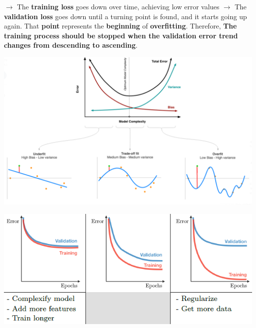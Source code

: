 \documentclass[letterpaper, 10.5pt,landscape]{article}
\begin{document}
\begin{multicols*}{3}
$\rightarrow$ The \textbf{training loss} goes down over time, achieving low error values
$\rightarrow$ The \textbf{validation loss} goes down until a turning point is found, and it starts going up again. That \textbf{point} represents the \textbf{beginning} of \textbf{overfitting}. Therefore, \textbf{The training process should be stopped when the validation error trend changes from descending to ascending}.


\vspace{-3pt}
\begin{center}
    \begin{minipage}{\linewidth}
        \includegraphics[width=\textwidth]{figures/bias_variance_overfitting_underfitting.PNG}
    \end{minipage}
\end{center}
\vspace{-6pt}


\begin{center}
    \begin{minipage}{0.9\linewidth}
        \includegraphics[width=\textwidth]{figures/bias_variance_overfitting_underfitting_LearningCurves.PNG}
    \end{minipage}
\end{center}









\end{multicols*}
\end{document}
